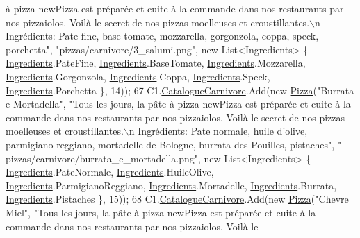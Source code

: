 \begin{DoxyCode}
{       à pizza newPizza est préparée et cuite à la commande dans nos restaurants par nos pizzaiolos. Voilà le
       secret de nos pizzas moelleuses et croustillantes.\(\backslash\)n Ingrédients: Pate fine, base tomate, mozzarella,
       gorgonzola, coppa, speck, porchetta"}, \textcolor{stringliteral}{"pizzas/carnivore/3\_salumi.png"}, \textcolor{keyword}{new} List<Ingredients> \{ 
      \hyperlink{namespaceModele_a001a8e89e56a724f24a249ba98080d41}{Ingredients}.PateFine, \hyperlink{namespaceModele_a001a8e89e56a724f24a249ba98080d41}{Ingredients}.BaseTomate, \hyperlink{namespaceModele_a001a8e89e56a724f24a249ba98080d41}{Ingredients}.Mozzarella, 
      \hyperlink{namespaceModele_a001a8e89e56a724f24a249ba98080d41}{Ingredients}.Gorgonzola, \hyperlink{namespaceModele_a001a8e89e56a724f24a249ba98080d41}{Ingredients}.Coppa, \hyperlink{namespaceModele_a001a8e89e56a724f24a249ba98080d41}{Ingredients}.Speck, 
      \hyperlink{namespaceModele_a001a8e89e56a724f24a249ba98080d41}{Ingredients}.Porchetta \}, 14));
67             C1.\hyperlink{classModele_1_1Catalogue_a4af9ef768f67cef6dfe545e22a6d63af}{CatalogueCarnivore}.Add(\textcolor{keyword}{new} \hyperlink{classModele_1_1Pizza}{Pizza}(\textcolor{stringliteral}{"Burrata e Mortadella"}, \textcolor{stringliteral}{"Tous les
       jours, la pâte à pizza newPizza est préparée et cuite à la commande dans nos restaurants par nos pizzaiolos.
       Voilà le secret de nos pizzas moelleuses et croustillantes.\(\backslash\)n Ingrédients: Pate normale, huile d’olive,
       parmigiano reggiano, mortadelle de Bologne, burrata des Pouilles, pistaches"}, \textcolor{stringliteral}{"
      pizzas/carnivore/burrata\_e\_mortadella.png"}, \textcolor{keyword}{new} List<Ingredients> \{ \hyperlink{namespaceModele_a001a8e89e56a724f24a249ba98080d41}{Ingredients}.PateNormale, \hyperlink{namespaceModele_a001a8e89e56a724f24a249ba98080d41}{Ingredients}.HuileOlive, 
      \hyperlink{namespaceModele_a001a8e89e56a724f24a249ba98080d41}{Ingredients}.ParmigianoReggiano, \hyperlink{namespaceModele_a001a8e89e56a724f24a249ba98080d41}{Ingredients}.Mortadelle, 
      \hyperlink{namespaceModele_a001a8e89e56a724f24a249ba98080d41}{Ingredients}.Burrata, \hyperlink{namespaceModele_a001a8e89e56a724f24a249ba98080d41}{Ingredients}.Pistaches \}, 15));
68             C1.\hyperlink{classModele_1_1Catalogue_a4af9ef768f67cef6dfe545e22a6d63af}{CatalogueCarnivore}.Add(\textcolor{keyword}{new} \hyperlink{classModele_1_1Pizza}{Pizza}(\textcolor{stringliteral}{"Chevre Miel"}, \textcolor{stringliteral}{"Tous les jours, la
       pâte à pizza newPizza est préparée et cuite à la commande dans nos restaurants par nos pizzaiolos. Voilà le
}
\end{DoxyCode}
